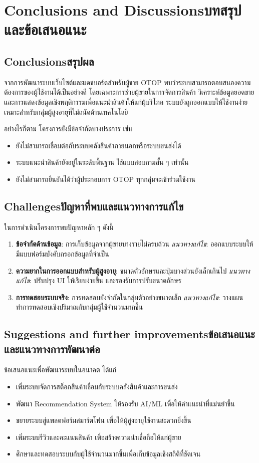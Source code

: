 \chapter{\ifenglish Conclusions and Discussions\else บทสรุปและข้อเสนอแนะ\fi}

\section{\ifenglish Conclusions\else สรุปผล\fi}
จากการพัฒนาระบบเว็บไซต์และแดชบอร์ดสำหรับผู้ขาย OTOP 
พบว่าระบบสามารถตอบสนองความต้องการของผู้ใช้งานได้เป็นอย่างดี 
โดยเฉพาะการช่วยผู้ขายในการจัดการสินค้า วิเคราะห์ข้อมูลยอดขาย 
และการแสดงข้อมูลเชิงพฤติกรรมเพื่อแนะนำสินค้าให้แก่ผู้บริโภค  
ระบบยังถูกออกแบบให้ใช้งานง่าย เหมาะสำหรับกลุ่มผู้สูงอายุที่ไม่ถนัดด้านเทคโนโลยี

อย่างไรก็ตาม โครงการยังมีข้อจำกัดบางประการ เช่น
\begin{itemize}
  \item ยังไม่สามารถเชื่อมต่อกับระบบคลังสินค้าภายนอกหรือระบบขนส่งได้
  \item ระบบแนะนำสินค้ายังอยู่ในระดับพื้นฐาน ใช้แบบสอบถามสั้น ๆ เท่านั้น
  \item ยังไม่สามารถยืนยันได้ว่าผู้ประกอบการ OTOP ทุกกลุ่มจะเข้าร่วมใช้งาน
\end{itemize}

\section{\ifenglish Challenges\else ปัญหาที่พบและแนวทางการแก้ไข\fi}
ในการดำเนินโครงการพบปัญหาหลัก ๆ ดังนี้
\begin{enumerate}
  \item \textbf{ข้อจำกัดด้านข้อมูล}: การเก็บข้อมูลจากผู้ขายบางรายไม่ครบถ้วน  
  \textit{แนวทางแก้ไข}: ออกแบบระบบให้มีแบบฟอร์มบังคับกรอกข้อมูลที่จำเป็น
  \item \textbf{ความยากในการออกแบบสำหรับผู้สูงอายุ}: ขนาดตัวอักษรและปุ่มบางส่วนยังเล็กเกินไป  
  \textit{แนวทางแก้ไข}: ปรับปรุง UI ให้เรียบง่ายขึ้น และรองรับการปรับขนาดอักษร
  \item \textbf{การทดสอบระบบจริง}: การทดสอบยังจำกัดในกลุ่มตัวอย่างขนาดเล็ก  
  \textit{แนวทางแก้ไข}: วางแผนทำการทดสอบเชิงปริมาณกับกลุ่มผู้ใช้จำนวนมากขึ้น
\end{enumerate}

\section{\ifenglish Suggestions and further improvements\else ข้อเสนอแนะและแนวทางการพัฒนาต่อ\fi}
ข้อเสนอแนะเพื่อพัฒนาระบบในอนาคต ได้แก่
\begin{itemize}
  \item เพิ่มระบบจัดการสต็อกสินค้าเชื่อมกับระบบคลังสินค้าและการขนส่ง
  \item พัฒนา Recommendation System ให้รองรับ AI/ML เพื่อให้คำแนะนำที่แม่นยำขึ้น
  \item ขยายระบบสู่แพลตฟอร์มสมาร์ตโฟน เพื่อให้ผู้สูงอายุใช้งานสะดวกยิ่งขึ้น
  \item เพิ่มระบบรีวิวและคะแนนสินค้า เพื่อสร้างความน่าเชื่อถือให้แก่ผู้ขาย
  \item ศึกษาและทดสอบระบบกับผู้ใช้จำนวนมากขึ้นเพื่อเก็บข้อมูลเชิงสถิติที่ชัดเจน
\end{itemize}
